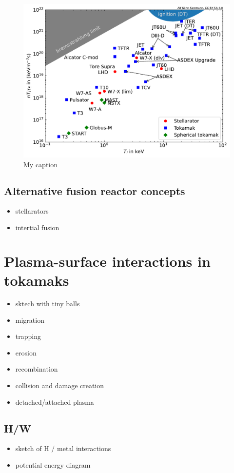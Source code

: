 \begin{figure}
    \centering
    \includegraphics[width=\linewidth]{Figures/Chapter1/triple_product_vs_T.pdf}
    \caption{My caption}
\end{figure}

\subsection{Alternative fusion reactor concepts}
\begin{itemize}
    \item stellarators
    \item intertial fusion
\end{itemize}

\section{Plasma-surface interactions in tokamaks}

\begin{itemize}
    \item sktech with tiny balls
    \item migration
    \item trapping
    \item erosion
    \item recombination
    \item collision and damage creation
    \item detached/attached plasma
\end{itemize}


\subsection{H/W}
\begin{itemize}
    \item sketch of H / metal interactions
    \item potential energy diagram
\end{itemize}
